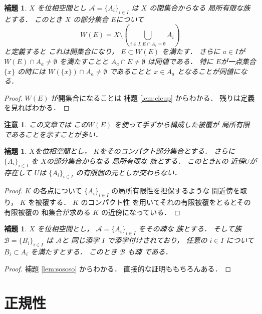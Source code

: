 \documentclass[leqno, a4paper, 12pt]{jsarticle}
\newtheorem{lem}[thm]{補題}
\newtheorem*{rmk}{注意}
\begin{document}
\begin{lem}\label{lem:wwww}
$X$
を位相空間とし
$\mathcal{A}=\{A_{i}\}_{i\in I}$
は
$X$
の閉集合からなる
局所有限な族とする．
このとき
$X$
の部分集合
$E$について
\[
W(E)=X\setminus \left(\bigcup_{i\in I, E\cap A_{i}=\emptyset}A_{i}\right)
\]
と定義すると
これは開集合になり，
$E\subset W(E)$
を満たす．
さらに
$a\in I$が
$W(E)\cap A_{a}\neq \emptyset$
を満たすことと
$A_{a}\cap E\neq \emptyset$
は同値である．
特に
$E$が一点集合
$\{x\}$
の時には
$W(\{x\})\cap A_{a}\neq \emptyset$
であることと
$x\in A_{a}$
となることが同値になる．
\end{lem}
\begin{proof}
$W(E)$
が開集合になることは
補題
\ref{lem:clcup}
からわかる．
残りは定義を見ればわかる．
\end{proof}
\begin{rmk}
この文章では
この$W(E)$
を使って手ずから構成した被覆が
局所有限であることを示すことが多い．
\end{rmk}



\begin{lem}\label{lem:cptfin}
$X$を位相空間とし，
$K$をそのコンパクト部分集合とする．
さらに
$\{A_{i}\}_{i\in I}$
を
$X$の部分集合からなる
局所有限な
族とする．
このとき$K$の
近傍$U$が存在して
$U$は
$\{A_{i}\}_{i\in I}$
の有限個の元としか交わらない．
\end{lem}
\begin{proof}
$K$
の各点について
$\{A_{i}\}_{i\in I}$
の局所有限性を担保するような
開近傍を取り，
$K$
を被覆する．
$K$
のコンパクト性
を用いてそれの有限被覆をとるとその有限被覆の
和集合が求める
$K$
の近傍になっている．
\end{proof}

\begin{lem}\label{lem:onaji}
$X$
を位相空間とし，
$\mathcal{A}=\{A_{i}\}_{i\in I}$
をその疎な
族とする．
そして族$\mathcal{B}=\{B_{i}\}_{i\in I}$
は
$\mathcal{A}$と
同じ添字
$I$
で添字付けされており，
任意の
$i\in I$
について
$B_{i}\subset A_{i}$
を満たすとする．
このとき
$\mathcal{B}$
も疎
である．
\end{lem}
\begin{proof}
補題
\ref{lem:sososo}
からわかる．
直接的な証明ももちろんある．
\end{proof}



\section{正規性}\label{sec:normalccpt}
\end{document}
